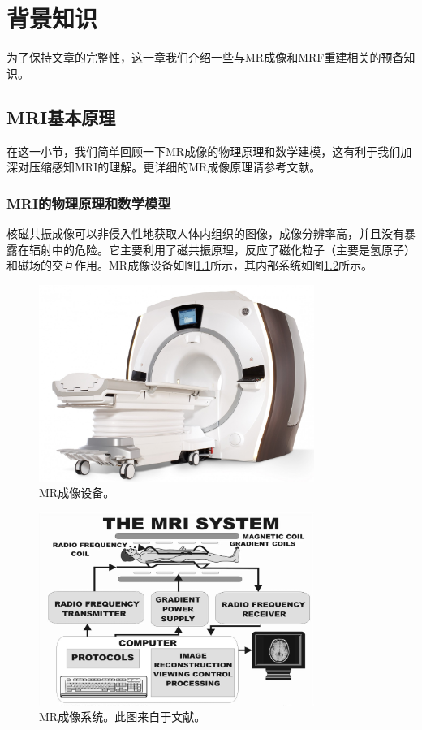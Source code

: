 \chapter{背景知识}
\label{chap:pre}
为了保持文章的完整性，这一章我们介绍一些与MR成像和MRF重建相关的预备知识。

\section{MRI基本原理}
\label{sec:mr}
在这一小节，我们简单回顾一下MR成像的物理原理和数学建模，这有利于我们加深对压缩感知MRI的理解。更详细的MR成像原理请参考文献\cite{mrireview,2009nmr,haacke1999magnetic}。

\subsection{MRI的物理原理和数学模型}
\label{sec:mrimodel}
核磁共振成像可以非侵入性地获取人体内组织的图像，成像分辨率高，并且没有暴露在辐射中的危险。它主要利用了磁共振原理，反应了磁化粒子（主要是氢原子）和磁场的交互作用。MR成像设备如图\ref{fig:mri}所示，其内部系统如图\ref{fig:system}所示。
\begin{figure}[htbp]
\centerline{\includegraphics[width=0.8\textwidth]{img/intro/mri.jpg}}
\caption{MR成像设备。}
\label{fig:mri}
\end{figure}
\begin{figure}[htbp]
\centering
\includegraphics[width=0.8\textwidth]{img/intro/system.eps}
\caption{MR成像系统。此图来自于文献\cite{sprawls2000magnetic}。}
\label{fig:system}
\end{figure}
